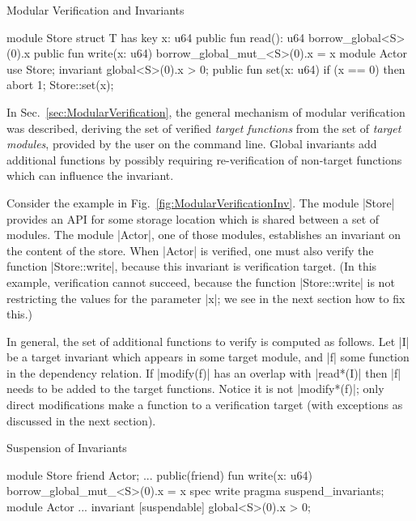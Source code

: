 \begin{Figure}
  \caption{Modular Verification and Invariants}
  \label{fig:ModularVerificationInv}
  \centering
\begin{MoveBox}
  module Store {
    struct T has key { x: u64 }
    public fun read(): u64 { borrow_global<S>(0).x }
    public fun write(x: u64) { borrow_global_mut_<S>(0).x = x }
  }
  module Actor {
    use Store;
    invariant global<S>(0).x > 0;
    public fun set(x: u64) {
      if (x == 0) then abort 1;
      Store::set(x);
    }
  }
\end{MoveBox}
\end{Figure}

In Sec.~\ref{sec:ModularVerification}, the general mechanism of modular
verification was described, deriving the set of verified \emph{target
  functions} from the set of \emph{target modules}, provided by the user on the
command line. Global invariants add additional functions by possibly requiring
re-verification of non-target functions which can influence the invariant.

Consider the example in Fig.~\ref{fig:ModularVerificationInv}. The module
|Store| provides an API for some storage location which is shared between a set
of modules. The module |Actor|, one of those modules, establishes an
invariant on the content of the store. When |Actor| is verified, one must
also verify the function |Store::write|, because this invariant is verification
target.  (In this example, verification cannot succeed, because the function
|Store::write| is not restricting the values for the parameter |x|; we see in
the next section how to fix this.)

In general, the set of additional functions to verify is computed as
follows. Let |I| be a target invariant which appears in some target module, and
|f| some function in the dependency relation. If |modify(f)| has an overlap
with |read*(I)| then |f| needs to be added to the target functions. Notice it is
not |modify*(f)|; only direct modifications make a function to a verification
target (with exceptions as discussed in the next section).



\begin{Figure}
  \caption{Suspension of Invariants}
  \label{fig:SuspensionInv}
  \centering
\begin{MoveBox}
  module Store {
    friend Actor;
    ...
    public(friend) fun write(x: u64) {
      borrow_global_mut_<S>(0).x = x
    }
    spec write { pragma suspend_invariants; }
  }
  module Actor {
    ...
    invariant [suspendable] global<S>(0).x > 0;
  }
\end{MoveBox}
\end{Figure}

